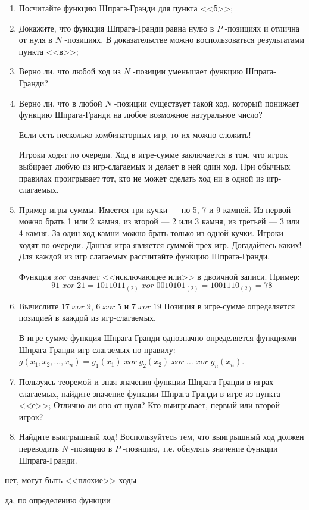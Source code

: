 \begin{problem}
\begin{enumerate}
\item	Посчитайте функцию Шпрага-Гранди для пункта <<б>>;\par
\item	Докажите, что функция Шпрага-Гранди равна нулю в  $P$ -позициях и отлична от нуля в  $N$ -позициях. В доказательстве можно воспользоваться результатами пункта <<в>>;\par
\item	Верно ли, что любой ход из  $N$ -позиции уменьшает функцию Шпрага-Гранди?\par
\item	Верно ли, что в любой  $N$ -позиции существует такой ход, который понижает функцию Шпрага-Гранди на любое возможное натуральное число?\par
Если есть несколько комбинаторных игр, то их можно сложить! \par
Игроки ходят по очереди. Ход в игре-сумме заключается в том, что игрок выбирает любую из игр-слагаемых и делает в ней один ход. При обычных правилах проигрывает тот, кто не может сделать ход ни в одной из игр-слагаемых.\par
\item	Пример игры-суммы. Имеется три кучки --- по 5, 7 и 9 камней. Из первой можно брать 1 или 2 камня, из второй --- 2 или 3 камня, из третьей --- 3 или 4 камня. За один ход камни можно брать только из одной кучки. Игроки ходят по очереди. Данная игра является суммой трех игр. Догадайтесь каких! Для каждой из игр слагаемых рассчитайте функцию Шпрага-Гранди.\par
Функция  $xor$  означает <<исключающее или>> в двоичной записи. Пример:
\[91\; xor\; 21=1011011_{\left(2\right)} \; xor\; 0010101_{\left(2\right)} =1001110_{\left(2\right)} =78\]
\item	Вычислите  $17\; xor\; 9$,  $6\; xor\; 5$  и  $7\; xor\; 19$
Позиция в игре-сумме определяется позицией в каждой из игр-слагаемых.\par
{}
В игре-сумме функция Шпрага-Гранди однозначно определяется функциями Шпрага-Гранди игр-слагаемых по правилу:  $g\left(x_{1},x_{2},\ldots,x_{n} \right)=g_{1} \left(x_{1} \right)\; xor\; g_{2} \left(x_{2} \right)\; xor\; \ldots \; xor\; g_{n} \left(x_{n} \right)$.
\item	Пользуясь теоремой и зная значения функции Шпрага-Гранди в играх-слагаемых, найдите значение функции Шпрага-Гранди в игре из пункта <<е>>; Отлично ли оно от нуля? Кто выигрывает, первый или второй игрок?\par
\item	Найдите выигрышный ход! Воспользуйтесь тем, что выигрышный ход должен переводить  $N$ -позицию в  $P$ -позицию, т.е. обнулять значение функции Шпрага-Гранди.
\end{enumerate}


\begin{sol}
\item нет, могут быть <<плохие>> ходы \par
\item да, по определению функции
\end{sol}
\end{problem}



